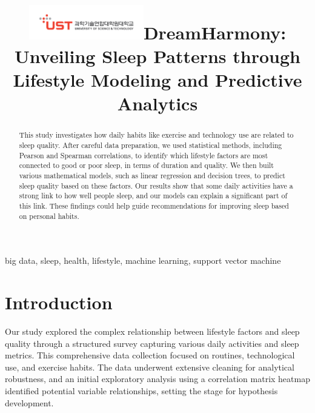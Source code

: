 \documentclass[conference]{IEEEtran}
\begin{document}

\title{\includegraphics[width=5cm]{images/ust.png}\linebreak DreamHarmony: Unveiling Sleep Patterns through Lifestyle Modeling and Predictive Analytics
}

\author{
}

\maketitle
\thispagestyle{plain} %
\pagestyle{plain} %

\begin{abstract}
    This study investigates how daily habits like exercise and technology use are related to sleep quality. After careful data preparation, we used statistical methods, including Pearson\cite{pearson} and Spearman correlations\cite{spearman}, to identify which lifestyle factors are most connected to good or poor sleep, in terms of duration and quality. We then built various mathematical models, such as linear regression and decision trees, to predict sleep quality based on these factors. Our results show that some daily activities have a strong link to how well people sleep, and our models can explain a significant part of this link. These findings could help guide recommendations for improving sleep based on personal habits.
\end{abstract}

\begin{IEEEkeywords}
    big data, sleep, health, lifestyle, machine learning, support vector machine
\end{IEEEkeywords}

\section{Introduction}
Our study explored the complex relationship between lifestyle factors and sleep quality through a structured survey capturing various daily activities and sleep metrics. This comprehensive data collection focused on routines, technological use, and exercise habits. The data underwent extensive cleaning for analytical robustness, and an initial exploratory analysis using a correlation matrix heatmap identified potential variable relationships, setting the stage for hypothesis development.
\end{document}
